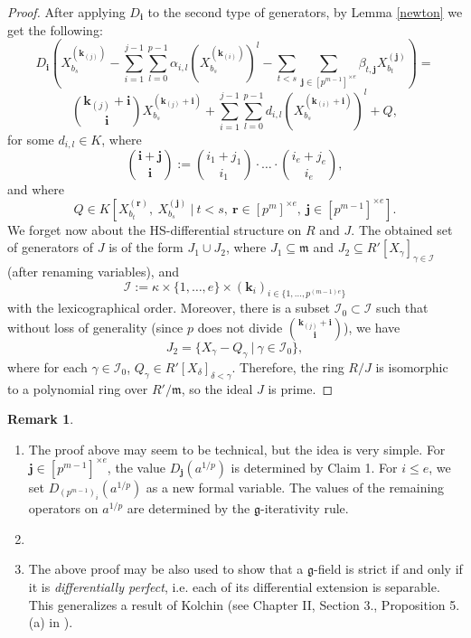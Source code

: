 \documentclass[10pt]{amsart}
\theoremstyle{definition}
\newtheorem{remark}[theorem]{Remark}
\begin{document}
\begin{proof}
After applying $D_{\mathbf{i}}$ to the second type of generators, by Lemma \ref{newton} we get the following:
$$D_{\mathbf{i}}\left(   X_{b_s}^{(\mathbf{k}_{(j)})} - \sum_{i=1}^{j-1}\sum_{l=0}^{p-1}\alpha_{i,l}\left(X_{b_s}^{(\mathbf{k}_{(i)})}\right)^l - \sum_{t<s}\sum_{\mathbf{j}\in [p^{m-1}]^{\times e}}\beta_{t,\mathbf{j}}X_{b_t}^{(\mathbf{j})} \right)  = $$
$$ {\mathbf{k}_{(j)}+\mathbf{i}\choose \mathbf{i}}X_{b_s}^{(\mathbf{k}_{(j)}+\mathbf{i})} + \sum_{i=1}^{j-1}\sum_{l=0}^{p-1}d_{i,l}\left(X_{b_s}^{(\mathbf{k}_{(i)}+\mathbf{i})}\right)^l + Q,$$
 for some $d_{i,l}\in K$, where
$${\mathbf{i}+\mathbf{j}\choose \mathbf{i}}:={i_1+j_1 \choose i_1}\cdot \ldots \cdot {i_e+j_e \choose i_e},$$
and where
$$Q\in K\left[X_{b_t}^{(\mathbf{r})},\ X^{(\mathbf{j})}_{b_s}\ |\ t<s,\ \mathbf{r}\in [p^m]^{\times e},\ \mathbf{j}\in [p^{m-1}]^{\times e}\right].$$
We forget now about the HS-differential structure on $R$ and $J$. The obtained set of generators of $J$ is of the form $J_1\cup J_2$, where $J_1\subseteq \mathfrak{m}$ and $J_2\subseteq R'[X_{\gamma}]_{\gamma\in \mathcal{I}}$ (after renaming variables), and
$$\mathcal{I}:=\kappa\times \{1,\ldots,e\}\times (\mathbf{k}_{i})_{i\in \{1,\ldots,p^{(m-1)e}\}}$$
with the lexicographical order. Moreover, there is a subset $\mathcal{I}_0\subset \mathcal{I}$ such that without loss of generality (since $p$ does not divide ${\mathbf{k}_{(j)}+\mathbf{i}\choose \mathbf{i}}$), we have
$$J_2=\{X_{\gamma}-Q_{\gamma}\ |\ \gamma\in \mathcal{I}_0\},$$
where for each $\gamma\in \mathcal{I}_0$, $Q_{\gamma}\in R'[X_{\delta}]_{\delta<\gamma}$. Therefore, the ring $R/J$ is isomorphic to a polynomial ring over $R'/\mathfrak{m}$, so the ideal $J$ is prime.
\end{proof}
\begin{remark}\label{values}
\begin{enumerate}
\item The proof above may seem to be technical, but the idea is very simple. For $\mathbf{j}\in [p^{m-1}]^{\times e}$, the value $D_{\mathbf{j}}(a^{1/p})$ is determined by Claim 1. For $i\leqslant e$, we set $D_{(p^{m-1})_i}(a^{1/p})$ as a new formal variable. The values of the remaining operators on $a^{1/p}$ are determined by the $\mathfrak{g}$-iterativity rule.

\item 

\item The above proof may be also used to show that a $\mathfrak{g}$-field is strict if and only if it is \emph{differentially perfect}, i.e. each of its differential extension is separable. This generalizes a result of Kolchin (see Chapter II, Section 3., Proposition 5.(a) in \cite{kol1}).
\end{enumerate}
\end{remark}
\end{document}

